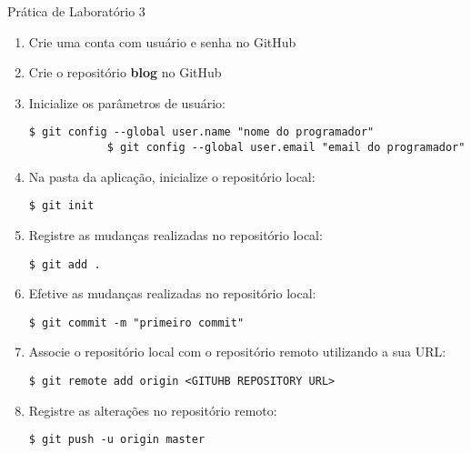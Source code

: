 \begin{frame}{Prática de Laboratório 3}
	\begin{enumerate}
		\item Crie uma conta com usuário e senha no GitHub
		\item Crie o repositório {\bf blog} no GitHub
		
		\item Inicialize os parâmetros de usuário: 
		\begin{lstlisting}[style=BashInputBasicStyle]
			$ git config --global user.name "nome do programador"
			$ git config --global user.email "email do programador"
		\end{lstlisting}
		
		\item Na pasta da aplicação, inicialize o repositório local:
		\begin{lstlisting}[style=BashInputBasicStyle]
			$ git init
		\end{lstlisting}
		
		\item Registre as mudanças realizadas no repositório local:
		\begin{lstlisting}[style=BashInputBasicStyle]
			$ git add .
		\end{lstlisting}

        \item Efetive as mudanças realizadas no repositório local:  		
        \begin{lstlisting}[style=BashInputBasicStyle]
			$ git commit -m "primeiro commit"
		\end{lstlisting}

		\item Associe o repositório local com o repositório remoto utilizando a sua URL:
		\begin{lstlisting}[style=BashInputBasicStyle]
			$ git remote add origin <GITUHB REPOSITORY URL>
		\end{lstlisting}

		\item Registre as alterações no repositório remoto:
		\begin{lstlisting}[style=BashInputBasicStyle]
			$ git push -u origin master
		\end{lstlisting}
	\end{enumerate}
\end{frame}